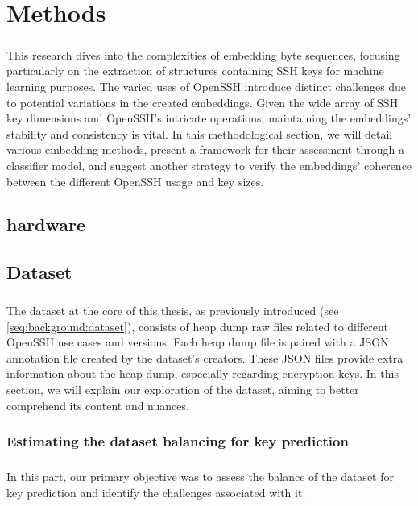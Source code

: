 \chapter{Methods}\label{chap:methods}
    \paragraph{}This research dives into the complexities of embedding byte sequences, focusing particularly on the extraction of structures containing SSH keys for machine learning purposes. The varied uses of OpenSSH introduce distinct challenges due to potential variations in the created embeddings. Given the wide array of SSH key dimensions and OpenSSH's intricate operations, maintaining the embeddings' stability and consistency is vital. In this methodological section, we will detail various embedding methods, present a framework for their assessment through a classifier model, and suggest another strategy to verify the embeddings' coherence between the different OpenSSH usage and key sizes.

    \section{hardware}
    

    \section{Dataset}
        \paragraph{}The dataset at the core of this thesis, as previously introduced (see \ref{seq:background:dataset}), consists of heap dump raw files related to different OpenSSH use cases and versions. Each heap dump file is paired with a JSON annotation file created by the dataset's creators. These JSON files provide extra information about the heap dump, especially regarding encryption keys. In this section, we will explain our exploration of the dataset, aiming to better comprehend its content and nuances.

        \subsection{Estimating the dataset balancing for key prediction}
            \paragraph{}In this part, our primary objective was to assess the balance of the dataset for key prediction and identify the challenges associated with it.

